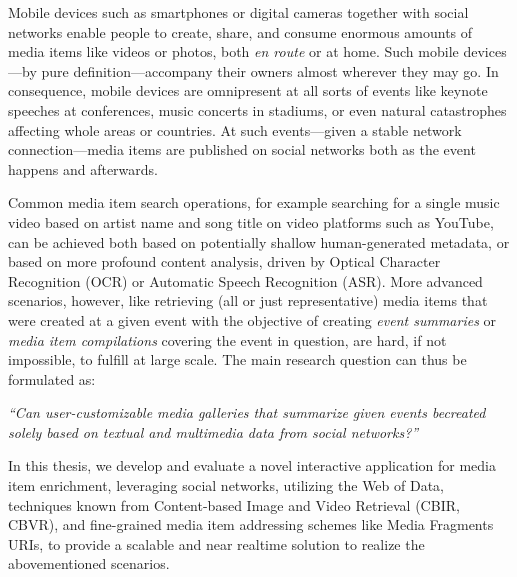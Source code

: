 


\begin{abstracts}        %
Mobile devices such as smartphones or digital cameras together with social networks
enable people to create, share, and consume enormous amounts of media items like videos or photos,
both \textit{en route} or at home.
Such mobile devices---by pure definition---accompany their owners almost wherever they may go.
In consequence, mobile devices are omnipresent at all sorts of events
like keynote speeches at conferences, music concerts in stadiums,
or even natural catastrophes affecting whole areas or countries.
At such events---given a stable network connection---media items are published
on social networks both as the event happens and afterwards.

Common media item search operations, for example searching for a single music video
based on artist name and song title on video platforms such as YouTube,
can be achieved both based on potentially shallow human-generated metadata,
or based on more profound content analysis,
driven by Optical Character Recognition (OCR) or Automatic Speech Recognition (ASR).
More advanced scenarios, however, like retrieving (all or just representative) media items
that were created at a given event with the objective of creating \emph{event summaries} or
\emph{media item compilations} covering the event in question, are hard,
if not impossible, to fulfill at large scale.
The main research question can thus be formulated as:

\textit{``Can user-customizable media galleries that summarize given events
be\linebreak created solely based on textual and multimedia data from social networks?''}

In this thesis, we develop and evaluate a novel interactive application
for media item enrichment, leveraging social networks, utilizing the Web of Data,
techniques known from Content-based Image and Video Retrieval (CBIR, CBVR),
and fine-grained media item addressing schemes like Media Fragments URIs,
to provide a scalable and near realtime solution to realize the abovementioned scenarios.


\end{abstracts}
